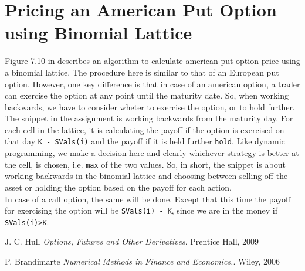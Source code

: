 \documentclass[11pt, fleqn]{article}
\begin{document}
\section{Pricing an American Put Option using Binomial Lattice}

Figure 7.10 in \cite{brandimarte} describes an algorithm to calculate american put option price using a binomial lattice. The procedure here is similar to that of an European put option. However, one key difference is that in case of an american option, a trader can exercise the option at any point until the maturity date. So, when working backwards, we have to consider wheter to exercise the option, or to hold further.\\

The snippet in the assignment is working backwards from the maturity day. For each cell in the lattice, it is calculating the payoff if the option is exercised on that day \texttt{K - SVals(i)} and the payoff if it is held further \texttt{hold}. Like dynamic programming, we make a decision here and clearly whichever strategy is better at the cell, is chosen, i.e. \texttt{max} of the two values. So, in short, the snippet is about working backwards in the binomial lattice and choosing between selling off the asset or holding the option based on the payoff for each action.\\

In case of a call option, the same will be done. Except that this time the payoff for exercising the option will be \texttt{SVals(i) - K}, since we are in the money if \texttt{SVals(i)>K}.


\begin{thebibliography}{9}
J. C. Hull
\textit{Options, Futures and Other Derivatives}. 
Prentice Hall, 2009

P. Brandimarte
\textit{Numerical Methods in Finance and Economics.}. 
Wiley, 2006

\end{thebibliography}
\end{document}

